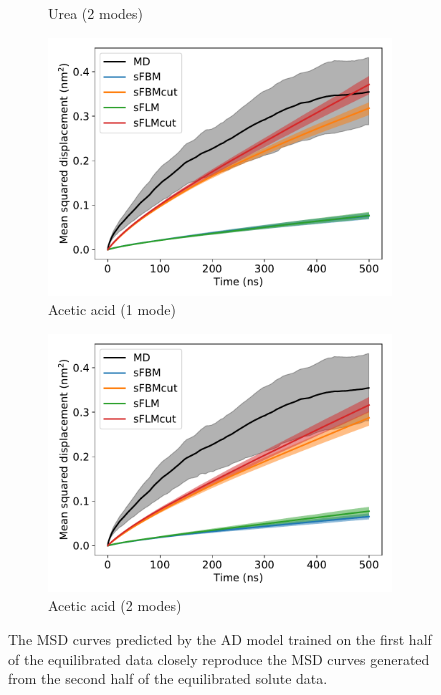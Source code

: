 \documentclass{article}
\begin{document}
\begin{figure}
\begin{subfigure}{0.45\textwidth}
  \caption{Urea (2 modes)}
  \end{subfigure}
  \begin{subfigure}{0.45\textwidth}
  \includegraphics[width=\textwidth]{1mode_msd_comparison_ACH_train_front.pdf}
  \caption{Acetic acid (1 mode)}
  \end{subfigure}
  \begin{subfigure}{0.45\textwidth}
  \includegraphics[width=\textwidth]{2mode_msd_comparison_ACH_train_front.pdf}
  \caption{Acetic acid (2 modes)}
  \end{subfigure} 
  \caption{The MSD curves predicted by the AD model trained on the first half 
  of the equilibrated data closely reproduce the MSD curves generated from the 
  second half of the equilibrated solute data.}\label{fig:train_test}
  \end{figure}
  
\end{document}
